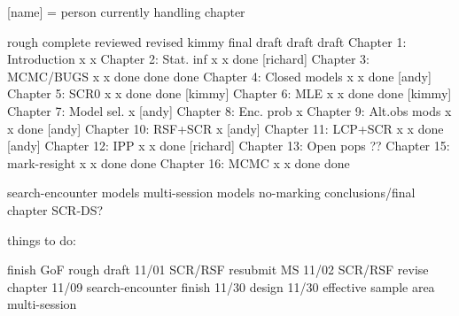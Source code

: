 [name] = person currently handling chapter


                          rough   complete reviewed  revised kimmy       final draft
                          draft    draft
Chapter 1: Introduction       x       x
Chapter 2: Stat. inf          x       x     done    [richard]
Chapter 3: MCMC/BUGS          x       x     done     done    done
Chapter 4: Closed models      x       x     done    [andy]
Chapter 5: SCR0               x       x     done     done   [kimmy]
Chapter 6: MLE                x       x     done     done   [kimmy]
Chapter 7: Model sel.         x     [andy]
Chapter 8: Enc. prob          x      
Chapter 9: Alt.obs mods       x       x     done    [andy] 
Chapter 10: RSF+SCR           x    [andy]
Chapter 11: LCP+SCR           x       x     done    [andy]
Chapter 12: IPP               x       x     done    [richard]
Chapter 13: Open pops        ??
Chapter 15: mark-resight      x       x     done     done 
Chapter 16: MCMC              x       x     done     done


search-encounter models
multi-session models
no-marking 
conclusions/final chapter
SCR-DS?


things to do:

finish GoF rough draft   11/01
SCR/RSF resubmit MS      11/02
SCR/RSF revise chapter   11/09
search-encounter finish  11/30
design                   11/30
effective sample area  
multi-session
